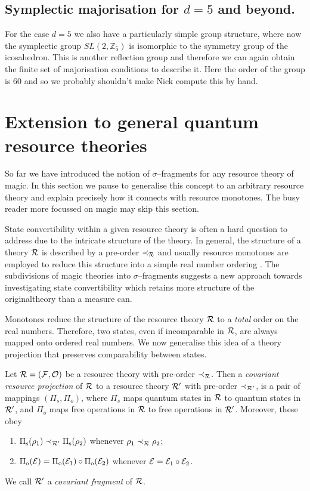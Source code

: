\documentclass[pra,
aps,
twocolumn,
superscriptaddress,
groupedaddress,
nofootinbib,
reprint
]{revtex4-1}
\begin{document}
\subsection{Symplectic majorisation for $d =5$ and beyond.}
For the case $d=5$ we also have a particularly simple group structure, where now the symplectic group $SL(2, \mathbb{Z}_5)$ is isomorphic to the symmetry group of the icosahedron. This is another reflection group and therefore we can again obtain the finite set of majorisation conditions to describe it. Here the order of the group is $60$ and so we probably shouldn't make Nick compute this by hand.


\section{Extension to general quantum resource theories}
\label{sec:frag}

So far we have introduced the notion of $\sigma$--fragments for any resource theory of magic. 
In this section we pause to generalise this concept to an arbitrary resource theory and explain precisely how it connects with resource monotones. 
The busy reader more focussed on magic may skip this section.

State convertibility within a given resource theory is often a hard question to address due to the intricate structure of the theory.
In general, the structure of a theory $\mathcal{R}$ is described by a pre-order $\prec_{\mathcal{R}}$ and usually resource monotones are employed to reduce this structure into a simple real number ordering .
The subdivisions of magic theories into $\sigma$--fragments suggests a new approach towards investigating state convertibility which retains more structure of the originaltheory than a measure can.

Monotones reduce the structure of the resource theory $\mathcal{R}$ to a \emph{total} order on the real numbers.
Therefore, two states, even if incomparable in $\mathcal{R}$, are always mapped onto ordered real numbers.
We now generalise this idea of a theory projection that preserves comparability between states. 
\begin{definition}\label{def:covproj}
Let $\mathcal{R} = (\mathcal{F}, \mathcal{O})$ be a resource theory with pre-order $\prec_{\mathcal{R}}$. 
Then a \emph{covariant resource projection} of $\mathcal{R}$ to a resource theory $\mathcal{R}'$ with pre-order $\prec_{\mathcal{R}'}$, is a pair of mappings $(\Pi_s, \Pi_o)$, where $\Pi_s$ maps quantum states in $\mathcal{R}$ to quantum states in $\mathcal{R}'$, and $\Pi_o$ maps free operations in $\mathcal{R}$ to free operations in $\mathcal{R}'$. 
Moreover, these obey
	\begin{enumerate}
        \item $\Pi_{\rm{s}}(\rho_1) \prec_{\mathcal{R}'} \Pi_{\rm{s}}(\rho_2)$ whenever $\rho_1 \prec_{\mathcal{R}} \rho_2$;
        \item $\Pi_{\rm{o}}(\mathcal{E}) = \Pi_{\rm{o}}(\mathcal{E}_1) \circ \Pi_{\rm{o}}(\mathcal{E}_2)$ whenever $\mathcal{E} = \mathcal{E}_1 \circ \mathcal{E}_2$.
    \end{enumerate}
We call $\mathcal{R}'$ a \emph{covariant fragment} of $\mathcal{R}$.
\end{definition}
\end{document}
